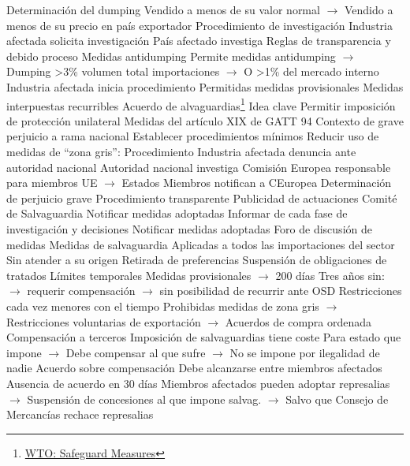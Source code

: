 \documentclass{nuevotema}
\begin{document}
\begin{esquemal}
			\3 Determinación del dumping
				\4 Vendido a menos de su valor normal
				\4[] $\to$  Vendido a menos de su precio en país exportador
			\3 Procedimiento de investigación
				\4 Industria afectada solicita investigación
				\4 País afectado investiga
				\4 Reglas de transparencia y debido proceso
			\3 Medidas antidumping
				\4 Permite medidas antidumping
				\4[] $\to$ Dumping >3\% volumen total importaciones
				\4[] $\to$ O >1\% del mercado interno
				\4 Industria afectada inicia procedimiento
				\4 Permitidas medidas provisionales
				\4 Medidas interpuestas recurribles
		\2 Acuerdo de alvaguardias\footnote{\href{https://www.wto.org/english/tratop_e/safeg_e/safeg_info_e.htm}{WTO: Safeguard Measures}}
			\3 Idea clave
				\4 Permitir imposición de protección unilateral
				\4[] Medidas del artículo XIX de GATT 94
				\4 Contexto de grave perjuicio a rama nacional
				\4 Establecer procedimientos mínimos
				\4 Reducir uso de medidas de ``zona gris'':
			\3 Procedimiento
				\4 Industria afectada denuncia ante autoridad nacional
				\4 Autoridad nacional investiga
				\4[] Comisión Europea responsable para miembros UE
				\4[] $\to$ Estados Miembros notifican a CEuropea
				\4 Determinación de perjuicio grave
				\4[] Procedimiento transparente
				\4[] Publicidad de actuaciones
				\4 Comité de Salvaguardia
				\4[] Notificar medidas adoptadas
				\4[] Informar de cada fase de investigación y decisiones
				\4[] Notificar medidas adoptadas
				\4[] Foro de discusión de medidas
			\3 Medidas de salvaguardia
				\4 Aplicadas a todos las importaciones del sector
				\4[] Sin atender a su origen
				\4 Retirada de preferencias
				\4 Suspensión de obligaciones de tratados
				\4 Límites temporales
				\4[] Medidas provisionales
				\4[] $\to$ 200 días
				\4[] Tres años sin:
				\4[] $\to$  requerir compensación
				\4[] $\to$ sin posibilidad de recurrir ante OSD
				\4 Restricciones cada vez menores con el tiempo
				\4 Prohibidas medidas de zona gris
				\4[] $\to$ Restricciones voluntarias de exportación
				\4[] $\to$ Acuerdos de compra ordenada
			\3 Compensación a terceros
				\4 Imposición de salvaguardias tiene coste
				\4[] Para estado que impone
				\4[] $\to$ Debe compensar al que sufre
				\4[] $\to$ No se impone por ilegalidad de nadie
				\4 Acuerdo sobre compensación
				\4[] Debe alcanzarse entre miembros afectados
				\4 Ausencia de acuerdo en 30 días
				\4[] Miembros afectados pueden adoptar represalias
				\4[] $\to$ Suspensión de concesiones al que impone salvag.
				\4[] $\to$ Salvo que Consejo de Mercancías rechace represalias

\end{esquemal}
\end{document}
